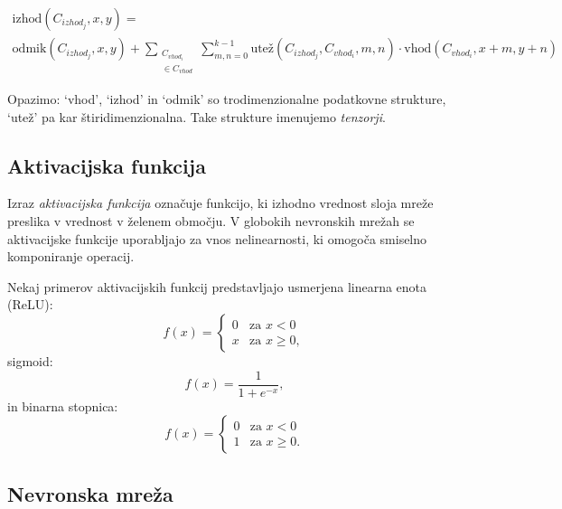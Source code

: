 \documentclass[a4paper,11pt]{article}
\begin{document}
\begin{multline*}
\text{izhod}(C_{izhod_j}, x, y) = \\
	\text{odmik}(C_{izhod_j}, x, y) + \sum_{\substack{C_{vhod_i} \\ \in C_{vhod}}} \sum_{m, n = 0}^{k - 1}
	\text{utež}(C_{izhod_j}, C_{vhod_i}, m, n) \cdot \text{vhod}(C_{vhod_i}, x + m, y + n)
\end{multline*}

Opazimo: `vhod', `izhod' in `odmik' so trodimenzionalne podatkovne strukture, `utež' pa kar štiridimenzionalna.
Take strukture imenujemo \emph{tenzorji}.

\subsection{Aktivacijska funkcija}

Izraz \emph{aktivacijska funkcija} označuje funkcijo, ki izhodno vrednost sloja mreže preslika v vrednost v želenem območju.\cite{activation_func_1}
V globokih nevronskih mrežah se aktivacijske funkcije uporabljajo za vnos nelinearnosti,
	ki omogoča smiselno komponiranje operacij.\cite{activation_func_2}

Nekaj primerov aktivacijskih funkcij predstavljajo usmerjena linearna enota (ReLU):
\begin{equation*} 
f(x) = \begin{cases}
	0 & \text{za } x < 0 \\
	x & \text{za } x \ge 0,
\end{cases}
\end{equation*}
sigmoid:
\begin{equation*} 
f(x) = \frac{1}{1 + e^{-x}},
\end{equation*}
in binarna stopnica:
\begin{equation*} 
f(x) = \begin{cases}
	0 & \text{za } x < 0 \\
	1 & \text{za } x \ge 0.
\end{cases}
\end{equation*}

\subsection{Nevronska mreža}
\end{document}
